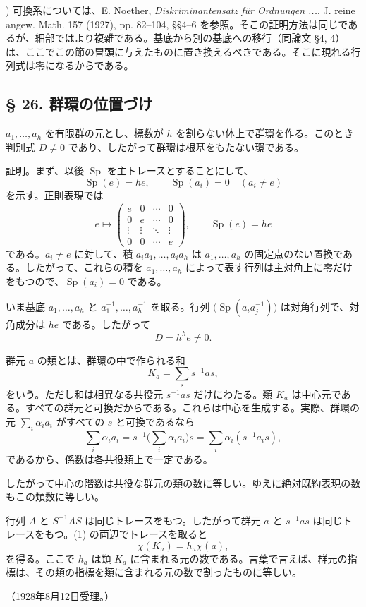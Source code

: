 \documentclass[11pt]{article}
\begin{document}
{\footnotesize{}) 可換系については、E. Noether, \emph{Diskriminantensatz für Ordnungen ...}, J. reine angew. Math. 157 (1927), pp. 82--104, §§4--6 を参照。そこの証明方法は同じであるが、細部ではより複雑である。基底から別の基底への移行（同論文 §4, 4）は、ここでこの節の冒頭に与えたものに置き換えるべきである。そこに現れる行列式は零になるからである。\par}

\subsection*{§ 26. 群環の位置づけ}

$a_1,\ldots,a_h$ を有限群の元とし、標数が $h$ を割らない体上で群環を作る。このとき判別式 $D\ne0$ であり、したがって群環は根基をもたない環である。

証明。まず、以後 $\operatorname{Sp}$ を主トレースとすることにして、
\[
        \operatorname{Sp}(e)=he,
        \qquad
        \operatorname{Sp}(a_i)=0\quad (a_i\ne e)
\]
を示す。正則表現では
\[
        e\mapsto\begin{pmatrix}e&0&\cdots&0\\0&e&\cdots&0\\\vdots&\vdots&\ddots&\vdots\\0&0&\cdots&e\end{pmatrix},
        \qquad \operatorname{Sp}(e)=he
\]
である。$a_i\ne e$ に対して、積 $a_i a_1,\ldots,a_i a_h$ は $a_1,\ldots,a_h$ の固定点のない置換である。したがって、これらの積を $a_1,\ldots,a_h$ によって表す行列は主対角上に零だけをもつので、$\operatorname{Sp}(a_i)=0$ である。

いま基底 $a_1,\ldots,a_h$ と $a_1^{-1},\ldots,a_h^{-1}$ を取る。行列 $\bigl(\operatorname{Sp}(a_i a_j^{-1})\bigr)$ は対角行列で、対角成分は $he$ である。したがって
\[
        D=h^h e\ne0.
\]

群元 $a$ の類とは、群環の中で作られる和
\[
        K_a=\sum_s s^{-1}as,                              \tag{1}
\]
をいう。ただし和は相異なる共役元 $s^{-1}as$ だけにわたる。類 $K_a$ は中心元である。すべての群元と可換だからである。これらは中心を生成する。実際、群環の元 $\sum_i \alpha_i a_i$ がすべての $s$ と可換であるなら
\[
        \sum_i\alpha_i a_i=s^{-1}\biggl(\sum_i\alpha_i a_i\biggr)s
        =\sum_i\alpha_i(s^{-1}a_i s),
\]
であるから、係数は各共役類上で一定である。

したがって中心の階数は共役な群元の類の数に等しい。ゆえに絶対既約表現の数もこの類数に等しい。

行列 $A$ と $S^{-1}AS$ は同じトレースをもつ。したがって群元 $a$ と $s^{-1}as$ は同じトレースをもつ。(1) の両辺でトレースを取ると
\[
        \chi(K_a)=h_a\chi(a),
\]
を得る。ここで $h_a$ は類 $K_a$ に含まれる元の数である。言葉で言えば、群元の指標は、その類の指標を類に含まれる元の数で割ったものに等しい。

\begin{center}
（1928年8月12日受理。）
\end{center}
\end{document}
